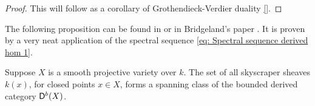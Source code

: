 \begin{proof}
    This will follow as a corollary of Grothendieck-Verdier duality \ref{}.
\end{proof}

The following proposition can be found in \cite[\S 3, Proposition 3.17]{huybrechts2006fouriermukai} or in Bridgeland's paper \cite[Example 2.2]{bridgeland2019equivalencestriangulatedcategoriesfouriermukai}. It is proven by a very neat application of the spectral sequence \eqref{eq: Spectral sequence derived hom 1}.

\begin{proposition}
    \label{k(x) spanning class}
    Suppose $X$ is a smooth projective variety over $k$. The set of all skyscraper sheaves $k(x)$, for closed points $x \in X$, forms a spanning class of the bounded derived category $\mathsf{D}^b(X)$.
\end{proposition}

